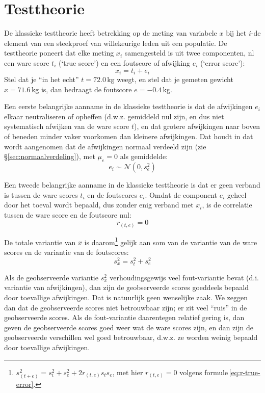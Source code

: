 \documentclass[
]{book}
\begin{document}
\section{Testtheorie}\label{testtheorie}

De klassieke testtheorie heeft betrekking op de meting van variabele \(x\)
bij het \(i\)-de element van een steekproef van willekeurige leden uit een
populatie. De testtheorie poneert dat elke meting \(x_i\) samengesteld is
uit twee componenten, nl een ware score \(t_i\) (`true score') en een
foutscore of afwijking \(e_i\) (`error score'):
\begin{equation}
  x_i = t_i + e_i
  \label{eq:obs-true-error}
\end{equation}
Stel dat je ``in het echt'' \(t=72.0\) kg weegt, en stel
dat je gemeten gewicht \(x=71.6\) kg is, dan bedraagt de foutscore
\(e=-0.4\) kg.

Een eerste belangrijke aanname in de klassieke testtheorie is dat de
afwijkingen \(e_i\) elkaar neutraliseren of opheffen (d.w.z. gemiddeld nul
zijn, en dus niet systematisch afwijken van de ware score \(t\)), en dat
grotere afwijkingen naar boven of beneden minder vaker voorkomen dan
kleinere afwijkingen. Dat houdt in dat wordt aangenomen dat de
afwijkingen normaal verdeeld zijn (zie
§\ref{sec:normaalverdeling}), met \(\mu_e=0\) als gemiddelde:
\begin{equation}
  \label{eq:normal-error}
  e_i \sim \mathcal{N}(0,s^2_e)
\end{equation}

Een tweede belangrijke aanname in de klassieke testtheorie is dat er
geen verband is tussen de ware scores \(t_i\) en de foutscores \(e_i\).
Omdat de component \(e_i\) geheel door het toeval wordt bepaald, dus
zonder enig verband met \(x_i\), is de correlatie tussen de ware score en
de foutscore nul:
\begin{equation}
  \label{eq:r-true-error}
  r_{(t,e)} = 0
\end{equation}

De totale variantie van \(x\) is daarom\footnote{\(s^2_{(t+e)} = s^2_t + s^2_e + 2  r_{(t,e)} s_t s_e\), met hier \(r_{(t,e)}=0\) volgens formule \eqref{eq:r-true-error}.} gelijk aan som van de
variantie van de ware scores en de variantie van de foutscores:
\begin{equation}
  \label{eq:var-true-error}
  s^2_x = s^2_t + s^2_e
\end{equation}

Als de geobserveerde variantie \(s^2_x\) verhoudingsgewijs veel
fout-variantie bevat (d.i. variantie van afwijkingen), dan zijn de
geobserveerde scores goeddeels bepaald door toevallige afwijkingen. Dat
is natuurlijk geen wenselijke zaak. We zeggen dan dat de geobserveerde
scores niet betrouwbaar zijn; er zit veel ``ruis'' in de geobserveerde
scores. Als de fout-variantie daarentegen relatief gering is, dan geven
de geobserveerde scores goed weer wat de ware scores zijn, en dan zijn
de geobserveerde verschillen wel goed betrouwbaar, d.w.z. ze worden
weinig bepaald door toevallige afwijkingen.
\end{document}
